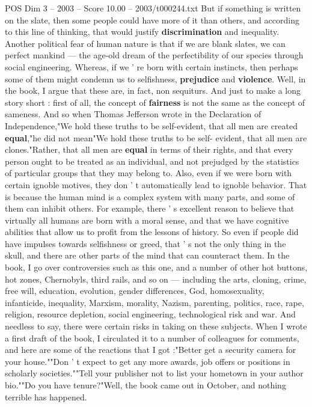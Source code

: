 \begin{textsample}{POS Dim 3 – 2003 – Score 10.00 – 2003/t000244.txt}
But if something is written on the slate, then some people could have more of it than others, and according to this line of thinking, that would justify \textbf{discrimination} and inequality.
Another political fear of human nature is that if we are blank slates, we can perfect mankind — the age-old dream of the perfectibility of our species through social engineering.
Whereas, if we ' re born with certain instincts, then perhaps some of them might condemn us to selfishness, \textbf{prejudice} and \textbf{violence}.
Well, in the book, I argue that these are, in fact, non sequiturs.
And just to make a long story short : first of all, the concept of \textbf{fairness} is not the same as the concept of sameness.
And so when Thomas Jefferson wrote in the Declaration of Independence,"We hold these truths to be self-evident, that all men are created \textbf{equal},"he did not mean"We hold these truths to be self- evident, that all men are clones."Rather, that all men are \textbf{equal} in terms of their rights, and that every person ought to be treated as an individual, and not prejudged by the statistics of particular groups that they may belong to.
Also, even if we were born with certain ignoble motives, they don ' t automatically lead to ignoble behavior.
That is because the human mind is a complex system with many parts, and some of them can inhibit others.
For example, there ' s excellent reason to believe that virtually all humans are born with a moral sense, and that we have cognitive abilities that allow us to profit from the lessons of history.
So even if people did have impulses towards selfishness or greed, that ' s not the only thing in the skull, and there are other parts of the mind that can counteract them.
In the book, I go over controversies such as this one, and a number of other hot buttons, hot zones, Chernobyls, third rails, and so on — including the arts, cloning, crime, free will, education, evolution, gender differences, God, homosexuality, infanticide, inequality, Marxism, morality, Nazism, parenting, politics, race, rape, religion, resource depletion, social engineering, technological risk and war.
And needless to say, there were certain risks in taking on these subjects.
When I wrote a first draft of the book, I circulated it to a number of colleagues for comments, and here are some of the reactions that I got :"Better get a security camera for your house.""Don ' t expect to get any more awards, job offers or positions in scholarly societies.""Tell your publisher not to list your hometown in your author bio.""Do you have tenure?"Well, the book came out in October, and nothing terrible has happened.

\end{textsample}
